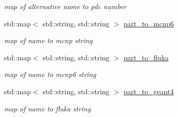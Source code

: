 \begin{DoxyCompactItemize}
\begin{DoxyCompactList}\small\item\em map of alternative name to pdc number \end{DoxyCompactList}\item 
std\+::map$<$ std\+::string, std\+::string $>$ \hyperlink{namespacepyne_1_1particle_a340aac212ae5cf8666cc47654c0889c4}{part\+\_\+to\+\_\+mcnp6}\hypertarget{namespacepyne_1_1particle_a340aac212ae5cf8666cc47654c0889c4}{}\label{namespacepyne_1_1particle_a340aac212ae5cf8666cc47654c0889c4}

\begin{DoxyCompactList}\small\item\em map of name to mcnp string \end{DoxyCompactList}\item 
std\+::map$<$ std\+::string, std\+::string $>$ \hyperlink{namespacepyne_1_1particle_a670bcdff7df3bec5a47da5a228ef41cf}{part\+\_\+to\+\_\+fluka}\hypertarget{namespacepyne_1_1particle_a670bcdff7df3bec5a47da5a228ef41cf}{}\label{namespacepyne_1_1particle_a670bcdff7df3bec5a47da5a228ef41cf}

\begin{DoxyCompactList}\small\item\em map of name to mcnp6 string \end{DoxyCompactList}\item 
std\+::map$<$ std\+::string, std\+::string $>$ \hyperlink{namespacepyne_1_1particle_a6032672d7a6469328b8df984e7383eab}{part\+\_\+to\+\_\+geant4}\hypertarget{namespacepyne_1_1particle_a6032672d7a6469328b8df984e7383eab}{}\label{namespacepyne_1_1particle_a6032672d7a6469328b8df984e7383eab}

\begin{DoxyCompactList}\small\item\em map of name to fluka string \end{DoxyCompactList}\end{DoxyCompactItemize}
